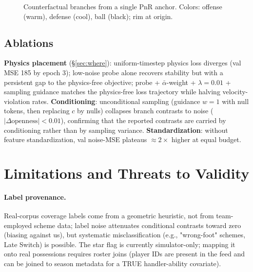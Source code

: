 \documentclass[11pt]{article}
\begin{document}
\begin{figure}[t]
\centering
{}
\caption{Counterfactual branches from a single PnR anchor. Colors: offense
(warm), defense (cool), ball (black); rim at origin.}
\label{fig:case}
\end{figure}

\subsection{Ablations}
\label{sec:res-ablate}

\textbf{Physics placement} (\S\ref{sec:where}): uniform-timestep physics loss
diverges (val MSE 185 by epoch 3); low-noise probe alone recovers stability
but with a persistent gap to the physics-free objective; probe +
$\bar\alpha$-weight + $\lambda{=}0.01$ + sampling guidance matches the
physics-free loss trajectory while halving velocity-violation rates.
\textbf{Conditioning}: unconditional sampling (guidance $w{=}1$ with null
tokens, then replacing $c$ by nulls) collapses branch contrasts to noise
($|\Delta\text{openness}| < 0.01$), confirming that the reported contrasts
are carried by conditioning rather than by sampling variance.
\textbf{Standardization}: without feature standardization, val noise-MSE
plateaus $\approx 2\times$ higher at equal budget.

\section{Limitations and Threats to Validity}
\label{sec:limits}

\paragraph{Label provenance.} Real-corpus coverage labels come from a
geometric heuristic, not from team-employed scheme data; label noise
attenuates conditional contrasts toward zero (biasing against us), but
systematic misclassification (e.g., "wrong-foot" schemes, Late Switch) is
possible. The star flag is currently simulator-only; mapping it onto real
possessions requires roster joins (player IDs are present in the feed and can
be joined to season metadata for a TRUE handler-ability covariate).
\end{document}
